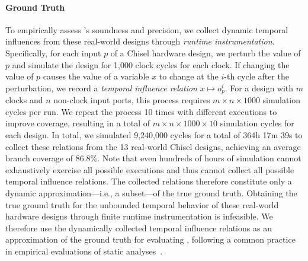 \paragraph{Ground Truth}
To empirically assess \tia's soundness and precision, we collect dynamic temporal influences from these real-world designs through \emph{runtime instrumentation}.
Specifically, for each input $p$ of a Chisel hardware design, we perturb the value of $p$ and simulate the design for 1,000 clock cycles for each clock.
If changing the value of $p$ causes the value of a variable $x$ to change at the $i$-th cycle after the perturbation, we record a \emph{temporal influence relation} $x \mapsto o_p^i$.
For a design with $m$ clocks and $n$ non-clock input ports, this process requires $m \times n \times 1000$ simulation cycles per run.
We repeat the process 10 times with different executions to improve coverage, resulting in a total of $m \times n \times 1000 \times 10$ simulation cycles for each design.
In total, we simulated 9,240,000 cycles for a total of 364h 17m 39s to collect these relations from the 13 real-world Chisel designs, achieving an average branch coverage of 86.8\%.
Note that even hundreds of hours of simulation cannot exhaustively exercise all possible executions and thus cannot collect all possible temporal influence relations.
The collected relations therefore constitute only a dynamic approximation---i.e., a subset---of the true ground truth.
Obtaining the true ground truth for the unbounded temporal behavior of these real-world hardware designs through finite runtime instrumentation is infeasible.
We therefore use the dynamically collected temporal influence relations as an approximation of the ground truth for evaluating \tia, following a common practice in empirical evaluations of static analyses~\cite{helm_total_2024,sui_recall_2020,liang_pointer_2025}.

